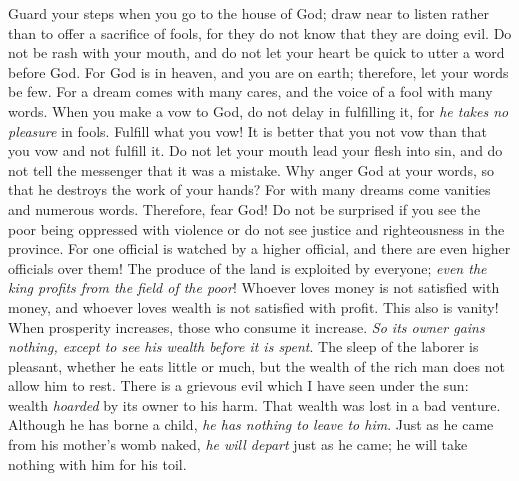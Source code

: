 \begin{biblechapter} %
  Guard your steps when you go to the house of God; 
draw near to listen rather than to offer a sacrifice of fools, 
for they do not know that they are doing evil.
\verse Do not be rash with your mouth, 
and do not let your heart be quick to utter a word before God. 
For God is in heaven, and you are on earth; 
therefore, let your words be few.
\verse For a dream comes with many cares, 
and the voice of a fool with many words.
\verse When you make a vow to God, 
do not delay in fulfilling it, 
for \textit{he takes no pleasure} in fools. 
Fulfill what you vow!
\verse It is better that you not vow 
than that you vow and not fulfill it.
\verse Do not let your mouth lead your flesh into sin, 
and do not tell the messenger that it was a mistake. 
Why anger God at your words, 
so that he destroys the work of your hands?
\verse For with many dreams come vanities and numerous words. 
Therefore, fear God!
 Do not be surprised if you see the poor being oppressed with violence 
or do not see justice and righteousness in the province. 
For one official is watched by a higher official, 
and there are even higher officials over them!
\verse The produce of the land is exploited by everyone; 
\textit{even the king profits from the field of the poor}!
 Whoever loves money is not satisfied with money, 
and whoever loves wealth is not satisfied with profit. 
This also is vanity!
\verse When prosperity increases, 
those who consume it increase. 
\textit{So its owner gains nothing, 
except to see his wealth before it is spent}.
\verse The sleep of the laborer is pleasant, whether he eats little or much, 
but the wealth of the rich man does not allow him to rest.
 There is a grievous evil which I have seen under the sun: wealth \textit{hoarded} by its owner to his harm.
\verse That wealth was lost in a bad venture. Although he has borne a child, \textit{he has nothing to leave to him}.
\verse Just as he came from his mother’s womb naked, \textit{he will depart} just as he came; he will take nothing with him for his toil.

\end{biblechapter}
